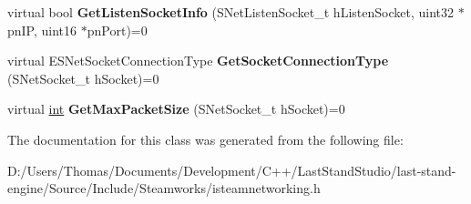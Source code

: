 \begin{DoxyCompactItemize}
\item 
\hypertarget{classISteamNetworking_a79f181bd4900cdfd53dbad9ef6c666c3}{}virtual bool {\bfseries Get\+Listen\+Socket\+Info} (S\+Net\+Listen\+Socket\+\_\+t h\+Listen\+Socket, uint32 $\ast$pn\+I\+P, uint16 $\ast$pn\+Port)=0\label{classISteamNetworking_a79f181bd4900cdfd53dbad9ef6c666c3}

\item 
\hypertarget{classISteamNetworking_ab71b58659a1c62bd021c22679ed37c9a}{}virtual E\+S\+Net\+Socket\+Connection\+Type {\bfseries Get\+Socket\+Connection\+Type} (S\+Net\+Socket\+\_\+t h\+Socket)=0\label{classISteamNetworking_ab71b58659a1c62bd021c22679ed37c9a}

\item 
\hypertarget{classISteamNetworking_a9536c5df8fe1b06194b12e1e7a589e95}{}virtual \hyperlink{SDL__thread_8h_a6a64f9be4433e4de6e2f2f548cf3c08e}{int} {\bfseries Get\+Max\+Packet\+Size} (S\+Net\+Socket\+\_\+t h\+Socket)=0\label{classISteamNetworking_a9536c5df8fe1b06194b12e1e7a589e95}

\end{DoxyCompactItemize}


The documentation for this class was generated from the following file\+:\begin{DoxyCompactItemize}
\item 
D\+:/\+Users/\+Thomas/\+Documents/\+Development/\+C++/\+Last\+Stand\+Studio/last-\/stand-\/engine/\+Source/\+Include/\+Steamworks/isteamnetworking.\+h\end{DoxyCompactItemize}
